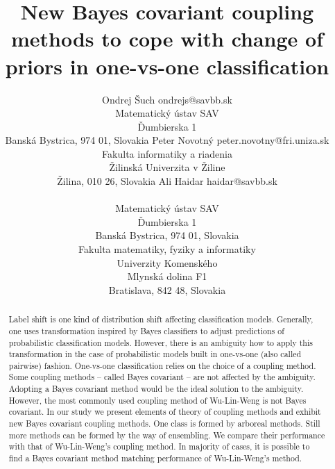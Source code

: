 \documentclass[twoside,11pt]{article}
\begin{document}
\title{New Bayes covariant coupling methods to cope with change of priors in one-vs-one classification }

\author{\name Ondrej Šuch \email ondrejs@savbb.sk \\
       \addr Matematický ústav SAV\\
       Ďumbierska 1\\
       Banská Bystrica, 974 01, Slovakia
       \AND
       \name Peter Novotný \email peter.novotny@fri.uniza.sk \\
       \addr Fakulta informatiky a riadenia\\
       Žilinská Univerzita v Žiline\\
       Žilina, 010 26, Slovakia
       \AND
       \name Ali Haidar \email haidar@savbb.sk \\
       \begin{minipage}[t]{0.45\textwidth}
       \addr Matematický ústav SAV\\
       Ďumbierska 1\\
       Banská Bystrica, 974 01, Slovakia
       \end{minipage}\hfill
       \begin{minipage}[t]{0.45\textwidth}
       \addr Fakulta matematiky, fyziky a informatiky\\
       Univerzity Komenského \\
       Mlynská dolina F1 \\
       Bratislava, 842 48, Slovakia
       \end{minipage}
       }


\maketitle

\begin{abstract}%
Label shift is one kind of distribution shift affecting classification models. Generally, one uses transformation inspired by Bayes classifiers to 
adjust predictions of probabilistic classification models. However, there is an ambiguity how to apply this transformation in the case of  probabilistic models built in one-vs-one (also called pairwise) fashion. One-vs-one classification relies on the choice of a coupling method. Some coupling methods -- called Bayes covariant --  are not affected by the ambiguity. Adopting a Bayes covariant method would be the ideal solution to the ambiguity. However, the most commonly used coupling  method of Wu-Lin-Weng is not Bayes covariant. In our study we present elements of theory of coupling methods and exhibit new Bayes covariant coupling methods. One class is formed by arboreal methods. Still more methods can be formed by the way of ensembling. We compare their performance with that of Wu-Lin-Weng's coupling method. In majority of cases, it is possible to find a Bayes covariant method matching performance of Wu-Lin-Weng's method. 


\end{abstract}
\end{document}
